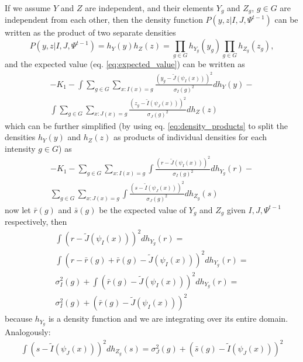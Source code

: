 If we assume $Y$ and $Z$ are independent, and their elements $Y_g$ and $Z_g$, $g\in G$ are independent from each other, then the density function $P(y,z| I, J, \Psi^{t-1})$ can be written as the product of two separate densities
\begin{equation}\label{eq:density_products}
    P(y,z| I, J, \Psi^{t-1}) = h_{Y}(y)h_{Z}(z) = \prod_{g\in G}h_{Y_g}(y_g) \prod_{g\in G}h_{Z_g}(z_g),
\end{equation}
and the expected value (eq. \ref{eq:expected_value}) can be written as
\begin{align}
    -K_{1}-\int\sum_{g\in G} \sum_{x : I(x) = g} \frac{\left(y_g - \tilde{J}(\psi_{I}(x))\right)^{2}}{\sigma_{I}(g)^{2}}d h_{Y}(y)-\\
    \nonumber\int\sum_{g\in G} \sum_{x : J(x) = g} \frac{\left(z_g - \tilde{I}(\psi_{J}(x))\right)^{2}}{\sigma_{J}(g)^{2}}d h_{Z}(z)
\end{align}
which can be further simplified (by using eq. \ref{eq:density_products} to split the densities $h_{Y}(y)$ and $h_{Z}(z)$ as products of individual densities for each intensity $g \in G$) as
\begin{align}
    -K_{1}-\sum_{g\in G} \sum_{x : I(x) = g} \int\frac{\left(r - \tilde{J}(\psi_{I}(x))\right)^{2}}{\sigma_{I}(g)^{2}}d h_{Y_g}(r)-\\
    \nonumber\sum_{g\in G} \sum_{x : J(x) = g} \int\frac{\left(s - \tilde{I}(\psi_{J}(x))\right)^{2}}{\sigma_{J}(g)^{2}}d h_{Z_g}(s)
\end{align}
now let $\bar{r}(g)$ and $\bar{s}(g)$ be the expected value of $Y_g$ and $Z_g$ given $I, J, \Psi^{t-1}$ respectively, then
\begin{align}
    &\int\left(r - \tilde{J}(\psi_{I}(x))\right)^{2}d h_{Y_g}(r) = &\\
    &\nonumber \int\left(r - \bar{r}(g) + \bar{r}(g) - \tilde{J}(\psi_{I}(x))\right)^{2}d h_{Y_g}(r) = &\\
    &\nonumber \sigma^{2}_{I}(g) + \int\left(\bar{r}(g) - \tilde{J}(\psi_{I}(x))\right)^{2}d h_{Y_g}(r) = &\\
    &\nonumber \sigma^{2}_{I}(g) + \left(\bar{r}(g) - \tilde{J}(\psi_{I}(x))\right)^{2}&
\end{align}
because $h_{Y_g}$ is a density function and we are integrating over its entire domain. Analogously:
\begin{align}
    \int\left(s - \tilde{I}(\psi_{J}(x))\right)^{2}d h_{Z_g}(s) = \sigma^{2}_{J}(g) + \left(\bar{s}(g) - \tilde{I}(\psi_{J}(x))\right)^{2}
\end{align}

